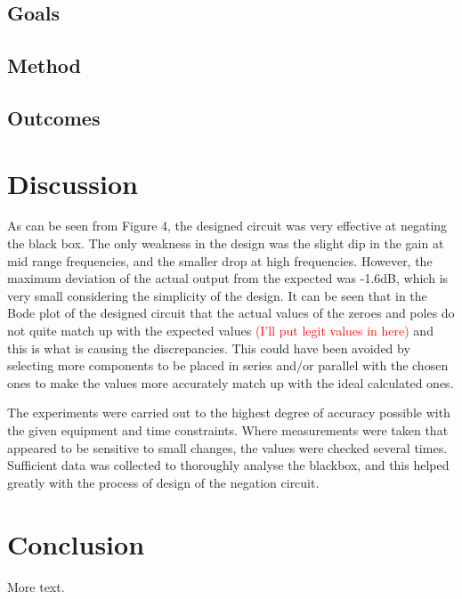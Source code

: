 \documentclass[12pt]{article} %
\begin{document}
\subsection{Goals}


\subsection{Method}


\subsection{Outcomes}
\pagebreak





\section{Discussion}

As can be seen from Figure 4, the designed circuit was very effective at negating the black box. The only weakness in the design was the slight dip in the gain at mid range frequencies, and the smaller drop at high frequencies. However, the maximum deviation of the actual output from the expected was -1.6dB, which is very small considering the simplicity of the design. It can be seen that in the Bode plot of the designed circuit that the actual values of the zeroes and poles do not quite match up with the expected values \textcolor{red}{(I'll put legit values in here)} and this is what is causing the discrepancies. This could have been avoided by selecting more components to be placed in series and/or parallel with the chosen ones to make the values more accurately match up with the ideal calculated ones.

The experiments were carried out to the highest degree of accuracy possible with the given equipment and time constraints. Where measurements were taken that appeared to be sensitive to small changes, the values were checked several times. Sufficient data was collected to thoroughly analyse the blackbox, and this helped greatly with the process of design of the negation circuit.

\pagebreak





\section{Conclusion}
More text.
\pagebreak
\end{document}
